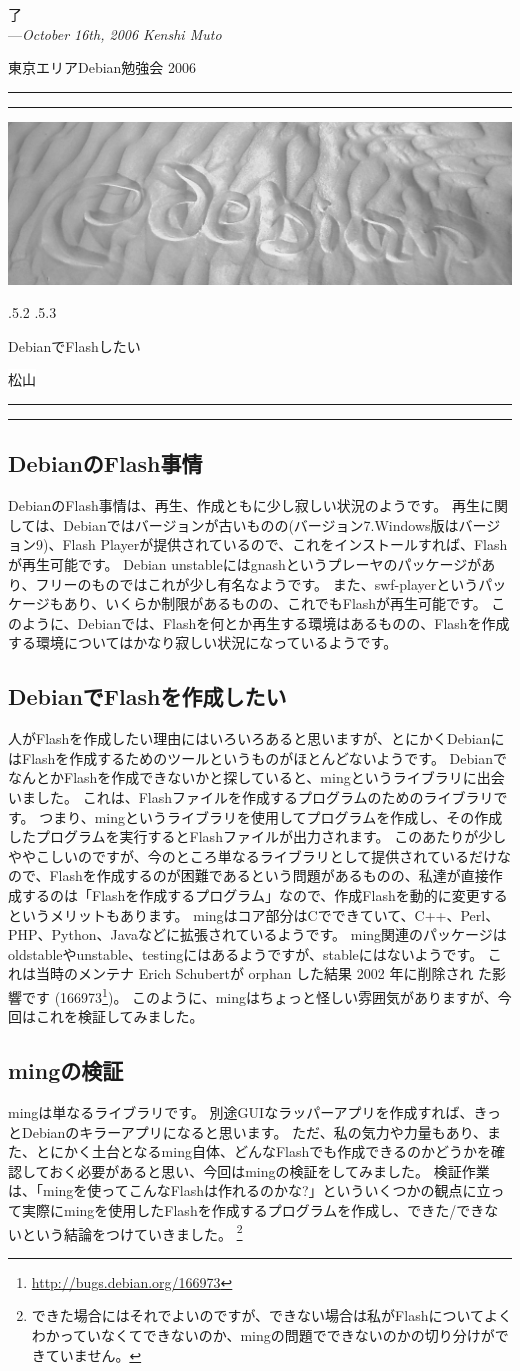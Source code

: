 \documentclass[mingoth,a4paper]{jsarticle}
\makeatletter
\renewcommand{\section}{\@startsection{section}{1}{\z@}%
    {\Cvs \@plus.5\Cdp \@minus.2\Cdp}%
    {.5\Cvs \@plus.3\Cdp}%
    {\normalfont\Huge\headfont\raggedright\centering}} %
\newcommand{\dancersection}[2]{%
\newpage
東京エリアDebian勉強会 2006
\hrule
\vspace{0.5mm}
\hrule
\hfill{}\includegraphics[width=16cm]{image2006-natsu/guruguru-sand-light.png}\\
\vspace{-5cm}
\begin{center}
\section{#1}
\end{center}
\hfill{}\colorbox{white}{#2}\hspace{3cm}\space\\
\vspace{1cm}
\hrule
\vspace{0.5mm}
\hrule
\vspace{1cm}
}
\newcommand{\debianbug}[1]{#1\footnote{\url{http://bugs.debian.org/#1}}}
\makeatother
\begin{document}
\begin{flushright}
  了\\
  ---\emph{October 16th, 2006 Kenshi Muto}
\end{flushright}



\dancersection{DebianでFlashしたい}{松山}

\subsection{DebianのFlash事情}
DebianのFlash事情は、再生、作成ともに少し寂しい状況のようです。
再生に関しては、Debianではバージョンが古いものの(バージョン7.Windows版はバージョン9)、Flash Playerが提供されているので、これをインストールすれば、Flashが再生可能です。
Debian unstableにはgnashというプレーヤのパッケージがあり、フリーのものではこれが少し有名なようです。
また、swf-playerというパッケージもあり、いくらか制限があるものの、これでもFlashが再生可能です。
このように、Debianでは、Flashを何とか再生する環境はあるものの、Flashを作成する環境についてはかなり寂しい状況になっているようです。

\subsection{DebianでFlashを作成したい}
人がFlashを作成したい理由にはいろいろあると思いますが、とにかくDebianにはFlashを作成するためのツールというものがほとんどないようです。
DebianでなんとかFlashを作成できないかと探していると、mingというライブラリに出会いました。
これは、Flashファイルを作成するプログラムのためのライブラリです。
つまり、mingというライブラリを使用してプログラムを作成し、その作成したプログラムを実行するとFlashファイルが出力されます。
このあたりが少しややこしいのですが、今のところ単なるライブラリとして提供されているだけなので、Flashを作成するのが困難であるという問題があるものの、私達が直接作成するのは「Flashを作成するプログラム」なので、作成Flashを動的に変更するというメリットもあります。
mingはコア部分はCでできていて、C++、Perl、PHP、Python、Javaなどに拡張されているようです。
ming関連のパッケージはoldstableやunstable、testingにはあるようですが、stableにはないようです。
これは当時のメンテナ Erich Schubertが orphan した結果 2002 年に削除され
た影響です (\debianbug{166973})。
このように、mingはちょっと怪しい雰囲気がありますが、今回はこれを検証してみました。

\subsection{mingの検証}
mingは単なるライブラリです。
別途GUIなラッパーアプリを作成すれば、きっとDebianのキラーアプリになると思います。
ただ、私の気力や力量もあり、また、とにかく土台となるming自体、どんなFlashでも作成できるのかどうかを確認しておく必要があると思い、今回はmingの検証をしてみました。
検証作業は、「mingを使ってこんなFlashは作れるのかな?」といういくつかの観点に立って実際にmingを使用したFlashを作成するプログラムを作成し、できた/できないという結論をつけていきました。
\footnote{できた場合にはそれでよいのですが、できない場合は私がFlashについてよくわかっていなくてできないのか、mingの問題でできないのかの切り分けができていません。}
\end{document}
